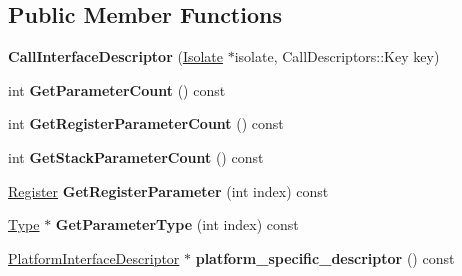 \subsection*{Public Member Functions}
\begin{DoxyCompactItemize}
\item 
{\bfseries Call\+Interface\+Descriptor} (\hyperlink{classv8_1_1internal_1_1_isolate}{Isolate} $\ast$isolate, Call\+Descriptors\+::\+Key key)\hypertarget{classv8_1_1internal_1_1_call_interface_descriptor_add604886d6d815e6497e2c4ab3d985dc}{}\label{classv8_1_1internal_1_1_call_interface_descriptor_add604886d6d815e6497e2c4ab3d985dc}

\item 
int {\bfseries Get\+Parameter\+Count} () const \hypertarget{classv8_1_1internal_1_1_call_interface_descriptor_ac51e5ce923e5182a12356bcd9e7bb969}{}\label{classv8_1_1internal_1_1_call_interface_descriptor_ac51e5ce923e5182a12356bcd9e7bb969}

\item 
int {\bfseries Get\+Register\+Parameter\+Count} () const \hypertarget{classv8_1_1internal_1_1_call_interface_descriptor_ada25c9a07b278cce8cbb733ae3521e2b}{}\label{classv8_1_1internal_1_1_call_interface_descriptor_ada25c9a07b278cce8cbb733ae3521e2b}

\item 
int {\bfseries Get\+Stack\+Parameter\+Count} () const \hypertarget{classv8_1_1internal_1_1_call_interface_descriptor_a50d98b80ad976e2a46eb796769515f10}{}\label{classv8_1_1internal_1_1_call_interface_descriptor_a50d98b80ad976e2a46eb796769515f10}

\item 
\hyperlink{structv8_1_1internal_1_1_register}{Register} {\bfseries Get\+Register\+Parameter} (int index) const \hypertarget{classv8_1_1internal_1_1_call_interface_descriptor_a7143fc26e366cff68b96d27968fd89a9}{}\label{classv8_1_1internal_1_1_call_interface_descriptor_a7143fc26e366cff68b96d27968fd89a9}

\item 
\hyperlink{classv8_1_1internal_1_1_type}{Type} $\ast$ {\bfseries Get\+Parameter\+Type} (int index) const \hypertarget{classv8_1_1internal_1_1_call_interface_descriptor_a523b0c936677bb3df614b1f8d0721c27}{}\label{classv8_1_1internal_1_1_call_interface_descriptor_a523b0c936677bb3df614b1f8d0721c27}

\item 
\hyperlink{classv8_1_1internal_1_1_platform_interface_descriptor}{Platform\+Interface\+Descriptor} $\ast$ {\bfseries platform\+\_\+specific\+\_\+descriptor} () const \hypertarget{classv8_1_1internal_1_1_call_interface_descriptor_a9d0a7d002d108fd6a2b6d8ad3cd81a83}{}\label{classv8_1_1internal_1_1_call_interface_descriptor_a9d0a7d002d108fd6a2b6d8ad3cd81a83}


\end{DoxyCompactItemize}
